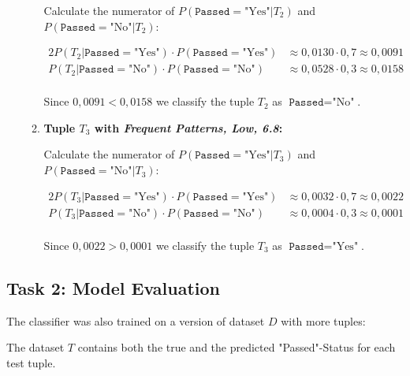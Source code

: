 \documentclass[
english,
smallborders
]{i6prcsht}
\newcommand{\BayesNumerator}[3]{P(#1 | \texttt{#2}=\text{"#3"}) \cdot P(\texttt{#2}=\text{"#3"})}
\newcommand{\PosterioriProbability}[3]{P(\texttt{#2}=\text{"#3"} | #1)}
\newcommand{\ResultClass}[2]{\texttt{#1}=\text{"#2"}}
\begin{document}
\begin{solution}
\begin{enumerate}
\begin{enumerate}
			            Calculate the numerator of $\PosterioriProbability{T_2}{Passed}{Yes}$ and $\PosterioriProbability{T_2}{Passed}{No}$:

			            \begin{alignat*}{2}
				            \BayesNumerator{T_2}{Passed}{Yes} & \approx 0,0130 \cdot 0,7 \approx 0,0091 \\
				            \BayesNumerator{T_2}{Passed}{No}  & \approx 0,0528 \cdot 0,3 \approx 0,0158 \\
			            \end{alignat*}

			            Since $0,0091 < 0,0158$ we classify the tuple $T_2$ as $\ResultClass{Passed}{No}$.

			      \item \textbf{Tuple $T_3$ with \textit{Frequent Patterns, Low, 6.8}:}

			            Calculate the numerator of $\PosterioriProbability{T_3}{Passed}{Yes}$ and $\PosterioriProbability{T_3}{Passed}{No}$:

			            \begin{alignat*}{2}
				            \BayesNumerator{T_3}{Passed}{Yes} & \approx 0,0032 \cdot 0,7 \approx 0,0022 \\
				            \BayesNumerator{T_3}{Passed}{No}  & \approx 0,0004 \cdot 0,3 \approx 0,0001 \\
			            \end{alignat*}

			            Since $0,0022 > 0,0001$ we classify the tuple $T_3$ as $\ResultClass{Passed}{Yes}$.
		      \end{enumerate}



	\end{enumerate}
\end{solution}

\subsection*{Task 2: Model Evaluation}

The classifier was also trained on a version of dataset $D$ with more tuples:

The dataset $T$ contains both the true and the predicted "Passed"-Status for each test tuple.
\end{document}
